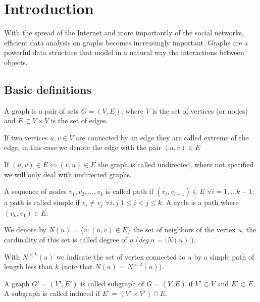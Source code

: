 
\chapter{Introduction}

With the spread of the Internet and more importantly of the social networks, efficient data analysis on graphs becomes increasingly important.
Graphs are a powerful data structure that model in a natural way the interactions between objects.


\section{Basic definitions}

\begin{definizione}\label{def:graph}
    A graph is a pair of sets $G=(V,E)$, where $V$ is the set of vertices (or nodes) and $E \subset V \times V$ is the set of edges.
\end{definizione}

If two vertices $u, v \in V$ are connected by an edge they are called extreme of the edge, in this case we denote the edge with the pair $(u, v) \in E$

If $(u,v) \in E \Leftrightarrow (v,u) \in E$ the graph is called undirected, where not specified we will only deal with undirected graphs.

A sequence of nodes  $v_{1}, v_{2}, \ldots, v_{k}$ is called path if $(v_{i}, v_{i+1}) \in E$ $\forall i = 1, \ldots k-1$; a path is called simple if $v_{i} \neq v_{j}$ $\forall i,j$ $1 \leq i < j \leq k$. A cycle is a path where $(v_{k}, v_{1}) \in E$.

We denote by $N(u) = \{ v : (u,v) \in E \}$ the set of neighbors of the vertex $u$, the cardinality of this set is called degree of $u$ (\textit{deg} $u$ = $|N(u)|)$. 

With $N^{<k}(u)$ we indicate the set of vertex connected to $u$ by a simple path of length less than $k$ (note that $N(u)$ = $N^{<2}(u)$).


\begin{definizione}\label{def:subgraph}
    A graph $G' = (V', E')$ is called subgraph of $G=(V,E)$ if $V' \subset V$ and $E' \subset E$. A subgraph is called induced if $E' = (V' \times V') \cap E$.
\end{definizione}

